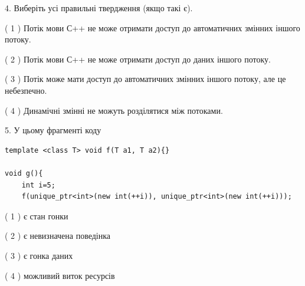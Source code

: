 \documentclass[12pt, ukrainian]{article}
\begin{document}
\begin {large}
{%
4. Виберіть усі правильні твердження (якщо такі є).\par
\vspace{2mm}

( 1 ) Потік мови С++ не може отримати доступ до автоматичних змінних іншого потоку.%

( 2 ) Потік мови С++ не може отримати доступ до даних іншого потоку.%

( 3 ) Потік може мати доступ до автоматичних змінних іншого потоку, але це небезпечно.%

( 4 ) Динамічні змінні не можуть розділятися між потоками.%


5. У цьому фрагменті коду
\begin{verbatim}
template <class T> void f(T a1, T a2){}

void g(){
    int i=5;
    f(unique_ptr<int>(new int(++i)), unique_ptr<int>(new int(++i)));
\end{verbatim}

( 1 ) є стан гонки%

( 2 ) є невизначена поведінка%

( 3 ) є гонка даних%

( 4 ) можливий виток ресурсів%
}
\end {large}
\end{document}

